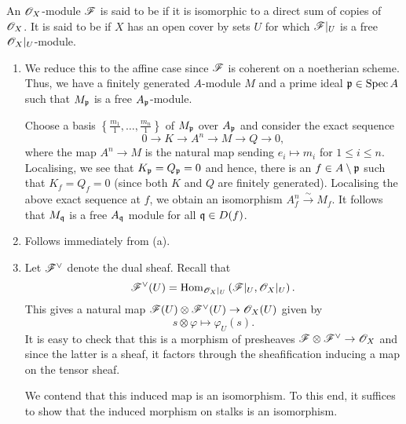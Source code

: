 \begin{definition}
    An $\mathscr{O}_X$-module $\mathscr{F}$ is said to be  if it is isomorphic to a direct sum of copies of $\mathscr{O}_X$. It is said to be  if $X$ has an open cover by sets $U$ for which $\mathscr{F}|_U$ is a free $\mathscr{O}_X|_U$-module.
\end{definition}

\setcounter{exercise}{6}
\begin{exercise} \hfill %
\begin{enumerate}[label=(\alph*)]
\item We reduce this to the affine case since $\mathscr{F}$ is coherent on a noetherian scheme. Thus, we have a finitely generated $A$-module $M$ and a prime ideal $\mathfrak{p}\in\operatorname{Spec} A$ such that $M_{\mathfrak{p}}$ is a free $A_{\mathfrak{p}}$-module. 

Choose a basis $\left\{\frac{m_1}{1},\dots,\frac{m_n}{1}\right\}$ of $M_{\mathfrak{p}}$ over $A_{\mathfrak{p}}$ and consider the exact sequence 
\begin{equation*}
    0\to K\to A^n\to M\to Q\to 0,
\end{equation*}
where the map $A^n\to M$ is the natural map sending $e_i\mapsto m_i$ for $1\le i\le n$. Localising, we see that $K_{\mathfrak{p}} = Q_{\mathfrak{p}} = 0$ and hence, there is an $f\in A\setminus\mathfrak{p}$ such that $K_f = Q_f = 0$ (since both $K$ and $Q$ are finitely generated). Localising the above exact sequence at $f$, we obtain an isomorphism $A^n_f\xrightarrow{\sim} M_f$. It follows that $M_{\mathfrak{q}}$ is a free $A_{\mathfrak{q}}$ module for all $\mathfrak{q}\in D(f)$.

\item Follows immediately from (a). 

\item Let $\mathscr{F}^\vee$ denote the dual sheaf. Recall that 
\begin{equation*}
    \mathscr{F}^\vee(U) = \operatorname{Hom}_{\mathscr{O}_X|_U}\left(\mathscr{F}|_U,\mathscr{O}_X|_U\right).
\end{equation*}
This gives a natural map $\mathscr{F}(U)\otimes\mathscr{F}^\vee(U) \to\mathscr{O}_X(U)$ given by 
\begin{equation*}
    s\otimes\varphi\mapsto\varphi_U(s).
\end{equation*}
It is easy to check that this is a morphism of presheaves $\mathscr{F}\otimes\mathscr{F}^\vee\to\mathscr{O}_X$ and since the latter is a sheaf, it factors through the sheafification inducing a map on the tensor sheaf.

We contend that this induced map is an isomorphism. To this end, it suffices to show that the induced morphism on stalks is an isomorphism.
\end{enumerate}
\end{exercise}
